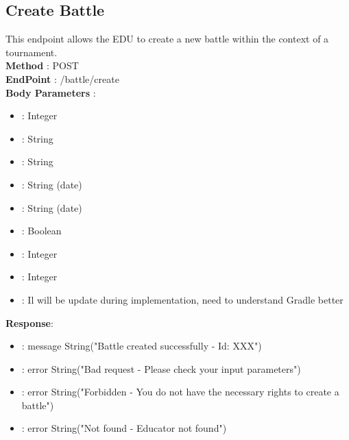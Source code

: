 \subsection*{Create Battle}
This endpoint allows the EDU to create a new battle within the context of a tournament.\\
\textbf{Method} : POST \\
\textbf{EndPoint} : /battle/create \\
\textbf{Body Parameters} :
\begin{itemize}
    \item {} : Integer
    \item {} : String
    \item {} : String
    \item {} : String (date)
    \item {} : String (date)
    \item {} : Boolean
    \item {} : Integer
    \item {} : Integer
    \item {} : Il will be update during implementation, need to understand Gradle better

\end{itemize}
\textbf{Response}:
\begin{itemize}
    \item {} : message String("Battle created successfully - Id: XXX")
    \item {} : error String("Bad request - Please check your input parameters")
    \item {} : error String("Forbidden - You do not have the necessary rights to create a battle")
    \item {} : error String("Not found - Educator not found")
\end{itemize}

